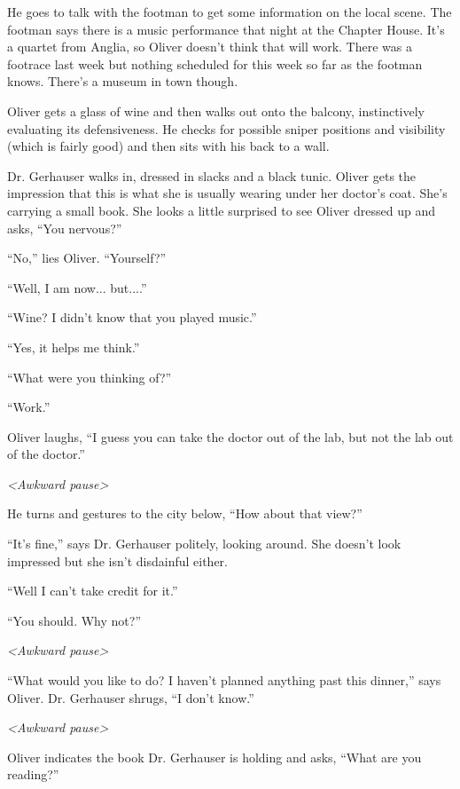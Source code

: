 He goes to talk with the footman to get some information on the local scene.  The footman says there is a music performance that night at the Chapter House.  It's a quartet from Anglia, so Oliver doesn't think that will work.  There was a footrace last week but nothing scheduled for this week so far as the footman knows.  There's a museum in town though.



Oliver gets a glass of wine and then walks out onto the balcony, instinctively evaluating its defensiveness.  He checks for possible sniper positions and visibility (which is fairly good) and then sits with his back to a wall.



Dr. Gerhauser walks in, dressed in slacks and a black tunic.  Oliver gets the impression that this is what she is usually wearing under her doctor's coat.  She's carrying a small book.  She looks a little surprised to see Oliver dressed up and asks, ``You nervous?''

``No,'' lies Oliver.  ``Yourself?''

``Well, I am now... but....''

``Wine?  I didn't know that you played music.''

``Yes, it helps me think.''

``What were you thinking of?''

``Work.''

Oliver laughs, ``I guess you can take the doctor out of the lab, but not the lab out of the doctor.''

\textit{\textless Awkward pause\textgreater }

He turns and gestures to the city below, ``How about that view?''

``It's fine,'' says Dr. Gerhauser politely, looking around.  She doesn't look impressed but she isn't disdainful either.

``Well I can't take credit for it.''

``You should.  Why not?''

\textit{\textless Awkward pause\textgreater }

``What would you like to do?  I haven't planned anything past this dinner,'' says Oliver.  Dr. Gerhauser shrugs, ``I don't know.''

\textit{\textless Awkward pause\textgreater }

Oliver indicates the book Dr. Gerhauser is holding and asks, ``What are you reading?''

